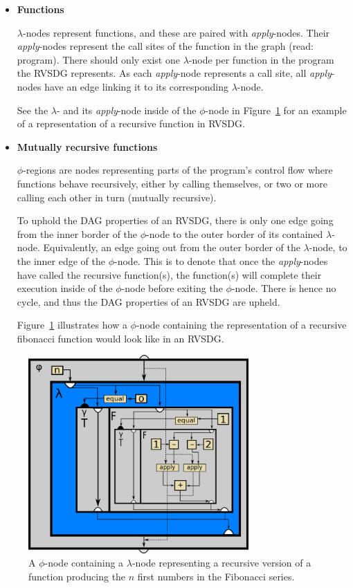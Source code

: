 \begin{itemize}
\item \textbf{Functions}

\textit{$\lambda$}-nodes represent functions, and these are paired with
\textit{apply}-nodes. Their \textit{apply}-nodes represent the call sites of the
function in the graph (read: program). There should only exist one
$\lambda$-node per function in the program the RVSDG represents. As each
\textit{apply}-node represents a call site, all \textit{apply}-nodes have an
edge linking it to its corresponding $\lambda$-node.

See the $\lambda$- and its \textit{apply}-node inside of the $\phi$-node in
Fĩgure~\ref{fig:rec_fib_phi} for an example of a representation of a recursive
function in RVSDG.

\item \textbf{Mutually recursive functions}

\textit{$\phi$}-regions are nodes representing parts of the program's control
flow where functions behave recursively, either by calling themselves, or two or
more calling each other in turn (mutually recursive).

To uphold the DAG properties of an RVSDG, there is only one edge going from the
inner border of the $\phi$-node to the outer border of its contained
$\lambda$-node. Equivalently, an edge going out from the outer border of the
$\lambda$-node, to the inner edge of the $\phi$-node. This is to denote that
once the \textit{apply}-nodes have called the recursive function(s), the
function(s) will complete their execution inside of the $\phi$-node before
exiting the $\phi$-node. There is hence no cycle, and thus the DAG properties of
an RVSDG are upheld.

Figure~\ref{fig:rec_fib_phi} illustrates how a $\phi$-node containing the
representation of a recursive fibonacci function would look like in an RVSDG.

\end{itemize}

\begin{figure}[h]
	\centering
	\includegraphics[width=0.75\textwidth]{figures/recursive_fibonacci}
	\caption{A $\phi$-node containing a $\lambda$-node representing a recursive
version of a function producing the $n$ first numbers in the Fibonacci series.}
	\label{fig:rec_fib_phi}
\end{figure}
